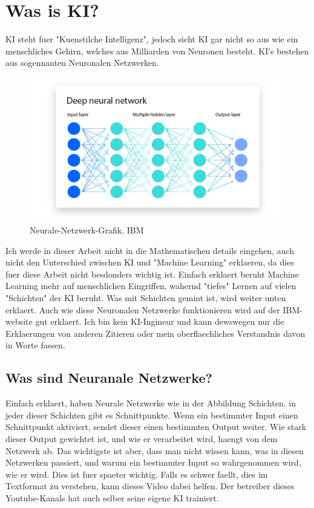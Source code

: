 \documentclass{report}
\begin{document}
\section{Was is KI?}
KI steht fuer "Kuenstilche Intelligenz", jedoch sieht KI gar nicht so aus wie ein menschliches Gehirn, welches aus Milliarden von Neuronen besteht.
KI's bestehen aus sogennanten Neuronalen Netzwerken. \citep{neural-networks}
\begin{figure}[h]
    \centering 
    \includegraphics[width=1\textwidth]{NN-ibm.png} 
    \caption{Neurale-Netzwerk-Grafik, IBM}
    \label{fig:meme}
\end{figure}
\newline
Ich werde in dieser Arbeit nicht in die Mathematischen details eingehen, auch nicht den Unterschied zwischen KI und "Machine Learning"  erklaeren, da dies fuer diese Arbeit nicht besdonders wichtig ist. Einfach erklaert beruht Machine Learning mehr auf menschlichen Eingriffen, wahernd "tiefes" Lernen auf vielen "Schichten" der KI beruht. Was mit Schichten gemint ist, wird weiter unten erklaert. Auch wie diese Neuronalen Netzwerke funktionieren wird auf der IBM-website \citep{ai-ibm} gut erklaert. Ich bin kein KI-Ingineur und kann dewswegen nur die Erklaerungen von anderen Zitieren oder mein oberflaechliches Verstandnis davon in Worte fassen.
\subsection{Was sind Neuranale Netzwerke?}
Einfach erklaert, haben Neurale Netzwerke wie in der Abbildung Schichten. in jeder dieser Schichten gibt es Schnittpunkte. Wenn ein bestimmter Input einen Schnittpunkt aktiviert, sendet dieser einen bestimmten Output weiter. Wie stark dieser Output gewichtet ist, und wie er verarbeitet wird, haengt von dem Netzwerk ab.
Das wichtigste ist aber, dass man nicht wissen kann, was in diesen Netzwerken passiert, und warum ein bestimmter Input so wahrgenommen wird, wie er wird. Dies ist fuer spaeter wichtig.
\newline
Falls es schwer faellt, dies im Textformat zu verstehen, kann dieses Video \citep{how-ai-is-trained} dabei helfen. Der betreiber dieses Youtube-Kanals hat auch selber seine eigene KI trainiert.
\end{document}
